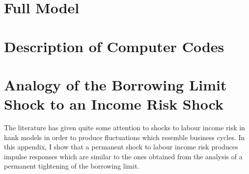 \documentclass[12pt]{article} %
\numberwithin{equation}{section} %
\begin{document}
\newpage
\thispagestyle{plain}
\renewcommand*{\thepage}{A-\arabic{page}} %
\begin{appendices}
\section{Full Model}
\label{sec-app:full}

\newpage
\thispagestyle{plain}
\section{Description of Computer Codes}
\label{sec-app:codes}

\newpage
\thispagestyle{plain}
\section{Analogy of the Borrowing Limit Shock to an Income Risk Shock}
\label{sec-app:income}
The literature has given quite some attention to shocks to labour income risk in \Gls{hank} models in order to produce fluctuations which resemble business cycles. In this appendix, I show that a permanent shock to labour income risk produces impulse responses which are similar to the ones obtained from the analysis of a permanent tightening of the borrowing limit.

\end{appendices}

\newpage
\thispagestyle{plain}
\end{document}
